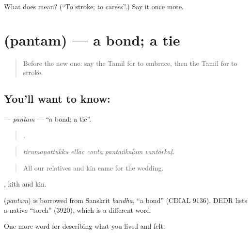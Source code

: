 \begin{tcolorbox}[breakable,colback=teal!4,colframe=teal!35!black,title={Before you move on}]
What does  mean? (\textquotedblleft{}To stroke; to caress\textquotedblright{}.) Say it once more.
\end{tcolorbox}
\section[\texorpdfstring{\ta{பந்தம்} (pantam)}{பந்தம் (pantam)}]{ (pantam) — a bond; a tie}

\label{lesson:TA-C502-pantam}



\begin{quote}
Before the new one: say the Tamil for to embrace, then the Tamil for to stroke.
\end{quote}

\subsection*{You'll want to know: }
\textbf{} — \emph{pantam} — \textquotedblleft{}a bond; a tie\textquotedblright{}.

\begin{quote}
    .
\end{quote}

\begin{quote}
\emph{tirumaṇattukku ellāc conta pantaṅkaḷum vantārkaḷ.}
\end{quote}

\begin{quote}
All our relatives and kin came for the wedding.
\end{quote}

 , kith and kin.

\begin{cousinweb}
\textbf{} (\emph{pantam}) is borrowed from Sanskrit \emph{bandha}, \textquotedblleft{}a bond\textquotedblright{} (CDIAL 9136). DEDR lists a native  \textquotedblleft{}torch\textquotedblright{} (3920), which is a different word.
\end{cousinweb}

\begin{grammarlens}[title={What you've built}]
One more word for describing what you lived and felt.
\end{grammarlens}

